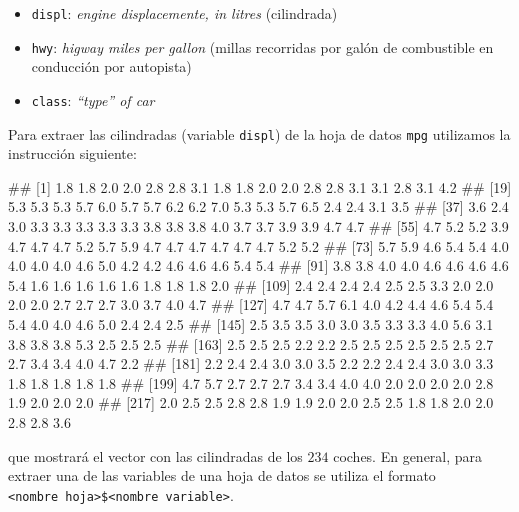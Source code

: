 \documentclass[
  title=normal,
  notoc,
  bib=normal]{mnye}
\newenvironment{Shaded}{\begin{snugshade}}{\end{snugshade}}
\newcommand{\NormalTok}[1]{#1}
\newcommand{\SpecialCharTok}[1]{\textcolor[rgb]{0.00,0.00,0.00}{#1}}
\providecommand{\tightlist}{%
  \setlength{\itemsep}{0pt}\setlength{\parskip}{0pt}}
\begin{document}
\begin{itemize}
\tightlist
\item
  \texttt{displ}: \emph{engine displacemente, in litres} (cilindrada)
\item
  \texttt{hwy}: \emph{higway miles per gallon} (millas recorridas por galón de combustible en conducción por autopista)
\item
  \texttt{class}: \emph{``type'' of car}
\end{itemize}

Para extraer las cilindradas (variable \texttt{displ}) de la hoja de datos \texttt{mpg} utilizamos la instrucción siguiente:

\begin{Shaded}
\end{Shaded}

\begin{Shaded}
\begin{Highlighting}[]
\NormalTok{\#\#   [1] 1.8 1.8 2.0 2.0 2.8 2.8 3.1 1.8 1.8 2.0 2.0 2.8 2.8 3.1 3.1 2.8 3.1 4.2}
\NormalTok{\#\#  [19] 5.3 5.3 5.3 5.7 6.0 5.7 5.7 6.2 6.2 7.0 5.3 5.3 5.7 6.5 2.4 2.4 3.1 3.5}
\NormalTok{\#\#  [37] 3.6 2.4 3.0 3.3 3.3 3.3 3.3 3.3 3.8 3.8 3.8 4.0 3.7 3.7 3.9 3.9 4.7 4.7}
\NormalTok{\#\#  [55] 4.7 5.2 5.2 3.9 4.7 4.7 4.7 5.2 5.7 5.9 4.7 4.7 4.7 4.7 4.7 4.7 5.2 5.2}
\NormalTok{\#\#  [73] 5.7 5.9 4.6 5.4 5.4 4.0 4.0 4.0 4.0 4.6 5.0 4.2 4.2 4.6 4.6 4.6 5.4 5.4}
\NormalTok{\#\#  [91] 3.8 3.8 4.0 4.0 4.6 4.6 4.6 4.6 5.4 1.6 1.6 1.6 1.6 1.6 1.8 1.8 1.8 2.0}
\NormalTok{\#\# [109] 2.4 2.4 2.4 2.4 2.5 2.5 3.3 2.0 2.0 2.0 2.0 2.7 2.7 2.7 3.0 3.7 4.0 4.7}
\NormalTok{\#\# [127] 4.7 4.7 5.7 6.1 4.0 4.2 4.4 4.6 5.4 5.4 5.4 4.0 4.0 4.6 5.0 2.4 2.4 2.5}
\NormalTok{\#\# [145] 2.5 3.5 3.5 3.0 3.0 3.5 3.3 3.3 4.0 5.6 3.1 3.8 3.8 3.8 5.3 2.5 2.5 2.5}
\NormalTok{\#\# [163] 2.5 2.5 2.5 2.2 2.2 2.5 2.5 2.5 2.5 2.5 2.5 2.7 2.7 3.4 3.4 4.0 4.7 2.2}
\NormalTok{\#\# [181] 2.2 2.4 2.4 3.0 3.0 3.5 2.2 2.2 2.4 2.4 3.0 3.0 3.3 1.8 1.8 1.8 1.8 1.8}
\NormalTok{\#\# [199] 4.7 5.7 2.7 2.7 2.7 3.4 3.4 4.0 4.0 2.0 2.0 2.0 2.0 2.8 1.9 2.0 2.0 2.0}
\NormalTok{\#\# [217] 2.0 2.5 2.5 2.8 2.8 1.9 1.9 2.0 2.0 2.5 2.5 1.8 1.8 2.0 2.0 2.8 2.8 3.6}
\end{Highlighting}
\end{Shaded}

que mostrará el vector con las cilindradas de los \(234\) coches.
En general, para extraer una de las variables de una hoja de datos se utiliza el formato \texttt{\textless{}nombre\ hoja\textgreater{}\$\textless{}nombre\ variable\textgreater{}}.
\end{document}
